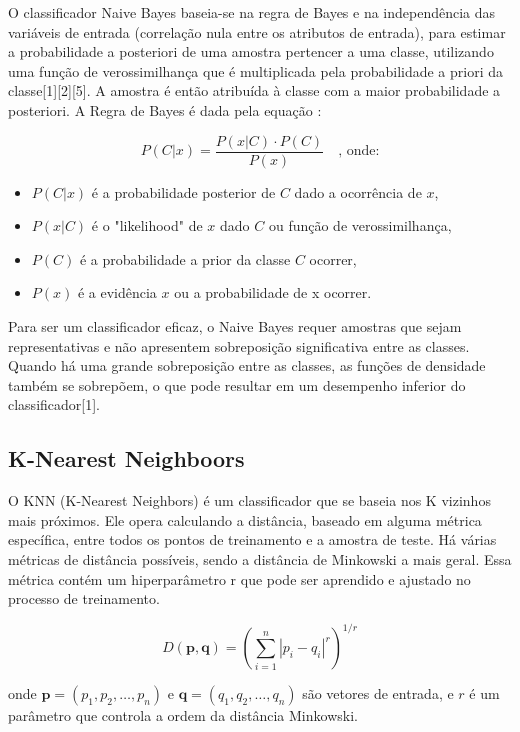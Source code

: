 \documentclass[conference]{IEEEtran}
\begin{document}
O classificador Naive Bayes baseia-se na regra de Bayes e na independência das variáveis de entrada (correlação nula entre os atributos de entrada), para estimar a probabilidade a posteriori de uma amostra pertencer a uma classe, utilizando uma função de verossimilhança que é multiplicada pela probabilidade a priori da classe[1][2][5]. A amostra é então atribuída à classe com a maior probabilidade a posteriori. A Regra de Bayes é dada pela equação :

\[
P(C|x) = \frac{P(x|C) \cdot P(C)}{P(x)} \quad \text{, onde:}
\]
\begin{itemize}
    \item \( P(C|x) \) é a probabilidade posterior de \( C \) dado a ocorrência de \( x \),
    \item \( P(x|C) \) é o "likelihood" de \( x \) dado \( C \) ou  função de verossimilhança,
    \item \( P(C) \) é a probabilidade a prior da classe \( C \) ocorrer,
    \item \( P(x) \) é a evidência \( x \) ou a probabilidade de x ocorrer.
\end{itemize}

\vspace{10pt}

Para ser um classificador eficaz, o Naive Bayes requer amostras que sejam representativas e não apresentem sobreposição significativa entre as classes. Quando há uma grande sobreposição entre as classes, as funções de densidade também se sobrepõem, o que pode resultar em um desempenho inferior do classificador[1].

\subsection{K-Nearest Neighboors}

O KNN (K-Nearest Neighbors) é um classificador que se baseia nos K vizinhos mais próximos. Ele opera calculando a distância, baseado em alguma métrica específica, entre todos os pontos de treinamento e a amostra de teste. Há várias métricas de distância possíveis, sendo a distância de Minkowski a mais geral. Essa métrica contém um hiperparâmetro r que pode ser aprendido e ajustado no processo de treinamento.

\[
D(\mathbf{p}, \mathbf{q}) = \left( \sum_{i=1}^{n} |p_i - q_i|^r \right)^{1/r}
\]

onde \( \mathbf{p} = (p_1, p_2, \ldots, p_n) \) e \( \mathbf{q} = (q_1, q_2, \ldots, q_n) \) são vetores de entrada, e \( r \) é um parâmetro que controla a ordem da distância Minkowski.
\end{document}

